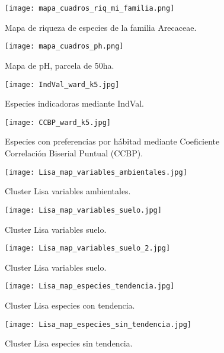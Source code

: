 \documentclass[11pt,]{article}
\begin{document}
\begin{figure}
\centering
\texttt{[image: mapa\_cuadros\_riq\_mi\_familia.png]}
\caption{Mapa de riqueza de especies de la familia Arecaceae.
\label{fig:mapa_cuadros_riq_mi_familia}}
\end{figure}

\begin{figure}
\centering
\texttt{[image: mapa\_cuadros\_ph.png]}
\caption{Mapa de pH, parcela de 50ha. \label{fig:mapa_cuadros_pH}}
\end{figure}

\begin{figure}
\centering
\texttt{[image: IndVal\_ward\_k5.jpg]}
\caption{Especies indicadoras mediante IndVal.
\label{fig:IndVal_ward_k5}}
\end{figure}

\begin{figure}
\centering
\texttt{[image: CCBP\_ward\_k5.jpg]}
\caption{Especies con preferencias por hábitad mediante Coeficiente
Correlación Biserial Puntual (CCBP). \label{fig:CCBP_ward_k5}}
\end{figure}

\begin{figure}
\centering
\texttt{[image: Lisa\_map\_variables\_ambientales.jpg]}
\caption{Cluster Lisa variables ambientales.
\label{fig:Lisa_map_variables_ambientales}}
\end{figure}

\begin{figure}
\centering
\texttt{[image: Lisa\_map\_variables\_suelo.jpg]}
\caption{Cluster Lisa variables suelo.
\label{fig:Lisa_map_variables_suelo}}
\end{figure}

\begin{figure}
\centering
\texttt{[image: Lisa\_map\_variables\_suelo\_2.jpg]}
\caption{Cluster Lisa variables suelo.
\label{fig:Lisa_map_variables_suelo_2}}
\end{figure}

\begin{figure}
\centering
\texttt{[image: Lisa\_map\_especies\_tendencia.jpg]}
\caption{Cluster Lisa especies con tendencia.
\label{fig:Lisa_map_especies_tendencia}}
\end{figure}

\begin{figure}
\centering
\texttt{[image: Lisa\_map\_especies\_sin\_tendencia.jpg]}
\caption{Cluster Lisa especies sin tendencia.
\label{fig:Lisa_map_especies_sin_tendencia}}
\end{figure}
\end{document}

